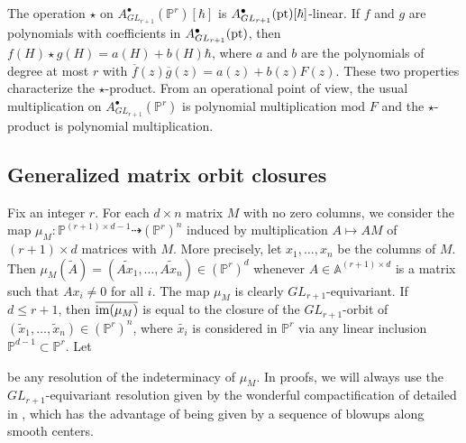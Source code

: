 \documentclass[12pt]{amsart}
\newcommand{\mb}{\mathbb}
\newcommand{\im}{{\rm im}}
\newcommand{\ol}{\overline}
\newcommand{\wt}{\widetilde}
\newcommand{\pt}{{\rm pt}}
\theoremstyle{plain}
\theoremstyle{definition}
\theoremstyle{remark}
\begin{document}
The operation $\star$ on $A^\bullet_{GL_{r+1}}(\mb{P}^r)[\hbar]$ is $A^\bullet_{GL_{r+1}}(\pt)[\hbar]$-linear. If $f$ and $g$ are polynomials with coefficients in $A^\bullet_{GL_{r+1}}(\pt)$, then $f(H) \star g(H)=a(H)+ b(H) \hbar$, where $a$ and $b$ are the polynomials of degree at most $r$ with $\overline{f}(z) \overline{g}(z) = a(z) + b(z)F(z)$. These two properties characterize the $\star$-product. From an operational point of view, the usual multiplication on $A^\bullet_{GL_{r+1}}(\mb{P}^r)$ is polynomial multiplication mod $F$ and the $\star$-product is polynomial multiplication.


\subsection{Generalized matrix orbit closures}
\label{Setup}
Fix an integer $r$. For each $d \times n$ matrix $M$ with no zero columns, we consider the map $\mu_M:\mb{P}^{(r+1)\times d-1}\dashrightarrow (\mb{P}^r)^n$ induced by multiplication $A \mapsto AM$ of $(r+1)\times d$ matrices with $M$. More precisely, let $x_1, \ldots, x_n$ be the columns of $M$. Then $\mu_M(\wt A) = (\wt {Ax_1}, \ldots, \wt {Ax_n}) \in (\mb{P}^r)^d$ whenever $A \in \mb{A}^{(r+1) \times d}$ is a matrix such that $Ax_i \neq 0$ for all $i$. The map $\mu_M$ is clearly $GL_{r+1}$-equivariant. If $d \leq r+1$, then $\ol{\im(\mu_M)}$ is equal to the closure of the $GL_{r+1}$-orbit of $(\wt{x}_1, \ldots, \wt{x}_n) \in (\mb{P}^r)^n$, where $\wt{x_i}$ is considered in $\mb{P}^r$ via any linear inclusion $\mb{P}^{d-1} \subset \mb{P}^r$.
Let
\begin{center}
\end{center}
be any resolution of the indeterminacy of $\mu_M$. In proofs, we will always use the $GL_{r+1}$-equivariant resolution given by the wonderful compactification of \cite{LiLi} detailed in , which has the advantage of being given by a sequence of blowups along smooth centers. 
\end{document}
